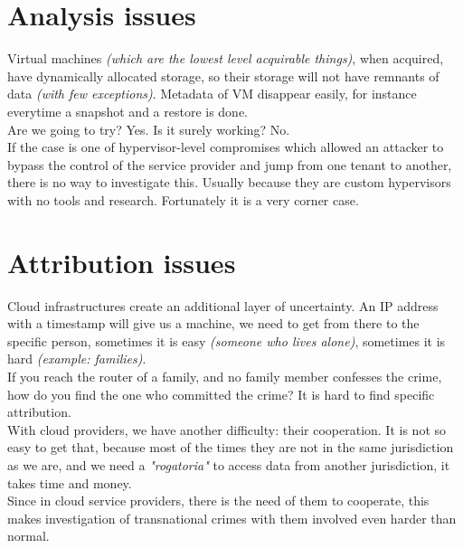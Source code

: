     \section{Analysis issues}
        Virtual machines \textit{(which are the lowest level acquirable things)}, when acquired, have dynamically allocated storage, so their storage will not have remnants of data \textit{(with few exceptions)}. Metadata of VM disappear easily, for instance everytime a snapshot and a restore is done.\\
        Are we going to try? Yes. Is it surely working? No.\\
        If the case is one of hypervisor-level compromises which allowed an attacker to bypass the control of the service provider and jump from one tenant to another, there is no way to investigate this. Usually because they are custom hypervisors with no tools and research. Fortunately it is a very corner case.
    \section{Attribution issues}
        Cloud infrastructures create an additional layer of uncertainty. An IP address with a timestamp will give us a machine, we need to get from there to the specific person, sometimes it is easy \textit{(someone who lives alone)}, sometimes it is hard \textit{(example: families)}.\\
        If you reach the router of a family, and no family member confesses the crime, how do you find the one who committed the crime? It is hard to find specific attribution.\\
        With cloud providers, we have another difficulty: their cooperation. It is not so easy to get that, because most of the times they are not in the same jurisdiction as we are, and we need a \textit{"rogatoria"} to access data from another jurisdiction, it takes time and money.\\
        Since in cloud service providers, there is the need of them to cooperate, this makes investigation of transnational crimes with them involved even harder than normal.
